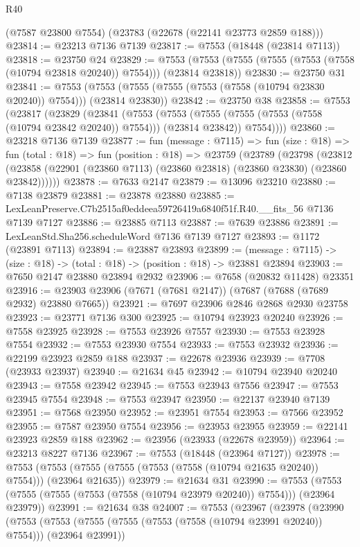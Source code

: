 \begin{lexlean}{R40}
\begin{coremodule}
    (@7587 @23800 @7554)
    (@23783 (@22678 (@22141 @23773 @2859 @188)))
@23814 := @23213 @7136 @7139
@23817 := @7553 (@18448 (@23814 @7113))
@23818 := @23750 @24
@23829 := @7553 (@7553 (@7555 (@7555 (@7553 (@7558 (@10794 @23818 @20240)) @7554))) (@23814 @23818))
@23830 := @23750 @31
@23841 := @7553 (@7553 (@7555 (@7555 (@7553 (@7558 (@10794 @23830 @20240)) @7554))) (@23814 @23830))
@23842 := @23750 @38
@23858 := @7553
    (@23817
      (@23829
        (@23841
          (@7553
            (@7553 (@7555 (@7555 (@7553 (@7558 (@10794 @23842 @20240)) @7554))) (@23814 @23842))
            @7554))))
@23860 := @23218 @7136 @7139
@23877 := fun (message : @7115) =>
  fun (size : @18) =>
  fun (total : @18) =>
  fun (position : @18) =>
  @23759
    (@23789
      (@23798
        (@23812 (@23858 (@22901 (@23860 @7113) (@23860 @23818) (@23860 @23830) (@23860 @23842))))))
@23878 := @7633 @2147
@23879 := @13096 @23210
@23880 := @7138 @23879
@23881 := @23878 @23880
@23885 := LexLeanPreserve.C7b2515af0eddeea59726419a6840f51f.R40.__fits_56 @7136 @7139 @7127
@23886 := @23885 @7113
@23887 := @7639 @23886
@23891 := LexLeanStd.Sha256.scheduleWord @7136 @7139 @7127
@23893 := @1172 (@23891 @7113)
@23894 := @23887 @23893
@23899 := (message : @7115) -> (size : @18) -> (total : @18) -> (position : @18) -> @23881 @23894
@23903 := @7650 @2147 @23880 @23894 @2932
@23906 := @7658 (@20832 @11428) @23351
@23916 := @23903 @23906 (@7671 (@7681 @2147)) (@7687 (@7688 (@7689 @2932) @23880 @7665))
@23921 := @7697 @23906 @2846 @2868 @2930 @23758
@23923 := @23771 @7136 @300
@23925 := @10794 @23923 @20240
@23926 := @7558 @23925
@23928 := @7553 @23926 @7557
@23930 := @7553 @23928 @7554
@23932 := @7553 @23930 @7554
@23933 := @7553 @23932
@23936 := @22199 @23923 @2859 @188
@23937 := @22678 @23936
@23939 := @7708 (@23933 @23937)
@23940 := @21634 @45
@23942 := @10794 @23940 @20240
@23943 := @7558 @23942
@23945 := @7553 @23943 @7556
@23947 := @7553 @23945 @7554
@23948 := @7553 @23947
@23950 := @22137 @23940 @7139
@23951 := @7568 @23950
@23952 := @23951 @7554
@23953 := @7566 @23952
@23955 := @7587 @23950 @7554
@23956 := @23953 @23955
@23959 := @22141 @23923 @2859 @188
@23962 := @23956 (@23933 (@22678 @23959))
@23964 := @23213 @8227 @7136
@23967 := @7553 (@18448 (@23964 @7127))
@23978 := @7553 (@7553 (@7555 (@7555 (@7553 (@7558 (@10794 @21635 @20240)) @7554))) (@23964 @21635))
@23979 := @21634 @31
@23990 := @7553 (@7553 (@7555 (@7555 (@7553 (@7558 (@10794 @23979 @20240)) @7554))) (@23964 @23979))
@23991 := @21634 @38
@24007 := @7553
    (@23967
      (@23978
        (@23990
          (@7553
            (@7553 (@7555 (@7555 (@7553 (@7558 (@10794 @23991 @20240)) @7554))) (@23964 @23991))

\end{coremodule}
\end{lexlean}
